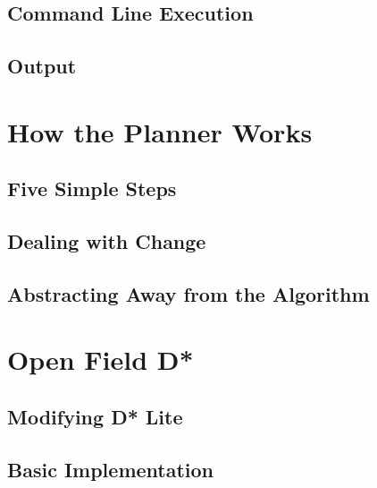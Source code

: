 \subsection{Command Line Execution}

\subsection{Output}


\section{How the Planner Works}

\subsection{Five Simple Steps}

\subsection{Dealing with Change}

\subsection{Abstracting Away from the Algorithm}


\section{Open Field D*}

\subsection{Modifying D* Lite}

\subsection{Basic Implementation}

